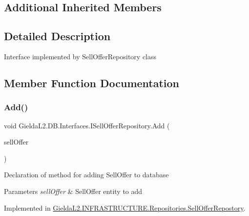 \subsection*{Additional Inherited Members}


\subsection{Detailed Description}
Interface implemented by Sell\+Offer\+Repository class 



\subsection{Member Function Documentation}
\mbox{\label{interface_gielda_l2_1_1_d_b_1_1_interfaces_1_1_i_sell_offer_repository_a18f7f7c3a677e89bdc055a6b4a6a248a}} 
\subsubsection{\texorpdfstring{Add()}{Add()}}
{\footnotesize\ttfamily void Gielda\+L2.\+D\+B.\+Interfaces.\+I\+Sell\+Offer\+Repository.\+Add (\begin{DoxyParamCaption}\item[{\mbox{\hyperlink{class_gielda_l2_1_1_d_b_1_1_entities_1_1_sell_offer}{Sell\+Offer}}}]{sell\+Offer }\end{DoxyParamCaption})}



Declaration of method for adding Sell\+Offer to database 


\begin{DoxyParams}{Parameters}
{\em sell\+Offer} & Sell\+Offer entity to add\\
\hline
\end{DoxyParams}


Implemented in \mbox{\hyperlink{class_gielda_l2_1_1_i_n_f_r_a_s_t_r_u_c_t_u_r_e_1_1_repositories_1_1_sell_offer_repostory_a9998a9883c5ae73fb854eeff44075e73}{Gielda\+L2.\+I\+N\+F\+R\+A\+S\+T\+R\+U\+C\+T\+U\+R\+E.\+Repositories.\+Sell\+Offer\+Repostory}}.

\mbox{\label{interface_gielda_l2_1_1_d_b_1_1_interfaces_1_1_i_sell_offer_repository_a9d5a9662923804caeedb86878a8635f7}} 
